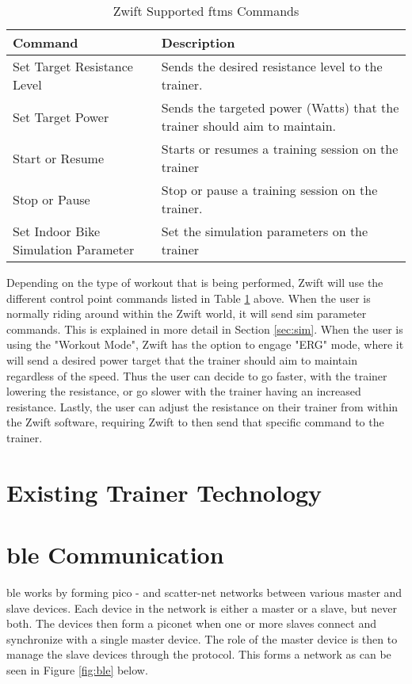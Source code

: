 \begin{table}[H]
	\renewcommand{\arraystretch}{1.5}
	\centering
	\caption{Zwift Supported \ac{ftms} Commands}
	\begin{tabularx}{0.8\textwidth}{ >{\raggedright}p{4cm} X}
		\toprule
		Command                              & Description                                                               \\
		\midrule
		Set Target Resistance Level          & Sends the desired resistance level to the trainer.                        \\
		Set Target Power                     & Sends the targeted power (Watts) that the trainer should aim to maintain. \\
		Start or Resume                      & Starts or resumes a training session on the trainer                       \\
		Stop or Pause                        & Stop or pause a training session on the trainer.                          \\
		Set Indoor Bike Simulation Parameter & Set the simulation parameters on the trainer                              \\
		\bottomrule
	\end{tabularx}
	\label{tab:blreq}
\end{table}

Depending on the type of workout that is being performed, Zwift will use the different control point commands listed in Table \ref{tab:blreq} above. When the user is normally riding around within the Zwift world, it will send \ac{sim} parameter commands. This is explained in more detail in Section \ref{sec:sim}. When the user is using the "Workout Mode", Zwift has the option to engage "ERG" mode, where it will send a desired power target that the trainer should aim to maintain regardless of the speed. Thus the user can decide to go faster, with the trainer lowering the resistance, or go slower with the trainer having an increased resistance. Lastly, the user can adjust the resistance on their trainer from within the Zwift software, requiring Zwift to then send that specific command to the trainer.

\newpage

\section{Existing Trainer Technology}


\section{\ac{ble} Communication}
\label{sec:ble}
\ac{ble} works by forming pico - and scatter-net networks between various master and slave devices. Each device in the network is either a master or a slave, but never both. The devices then form a piconet when one or more slaves connect and synchronize with a single master device. The role of the master device is then to manage the slave devices through the protocol. This forms a network as can be seen in Figure \ref{fig:ble} below.\\

